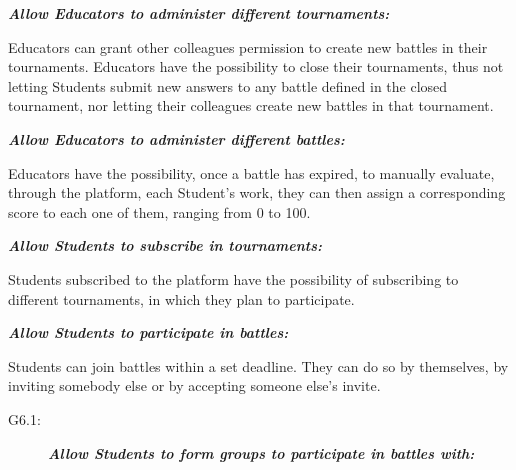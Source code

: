 \documentclass{article}
\begin{document}
\begin{description}
\begin{description}
          \end{description}
          \newpage
    \item[G3:] \textit{\textbf{Allow Educators to administer different tournaments:}}
          \begin{description}
              \item Educators can grant other colleagues permission to create new battles in their tournaments. 
              Educators have the possibility to close their tournaments, thus not letting Students submit new answers to any battle defined in the closed tournament,
              nor letting their colleagues create new battles in that tournament.
          \end{description}
    \item[G4:] \textit{\textbf{Allow Educators to administer different battles:}}
          \begin{description}
              \item Educators have the possibility, once a battle has expired, 
              to manually evaluate, through the platform, each Student's work, they can then assign a corresponding score to each one of them, ranging from 0 to 100.
          \end{description}
    \item[G5:] \textbf{\textit{Allow Students to subscribe in tournaments:}}
          \begin{description}
              \item Students subscribed to the platform have the possibility of subscribing to different tournaments, in which they plan to participate.
          \end{description}
    \item[G6:] \textbf{\textit{Allow Students to participate in battles:}}
          \begin{description}
              \item Students can join battles within a set deadline. They can do so by themselves, by inviting somebody else or by accepting someone else's invite.
                    \begin{description}
                        \item[G6.1:] \textbf{\textit{Allow Students to form groups to participate in battles with:}}
\end{description}
\end{description}
\end{description}
\end{document}
